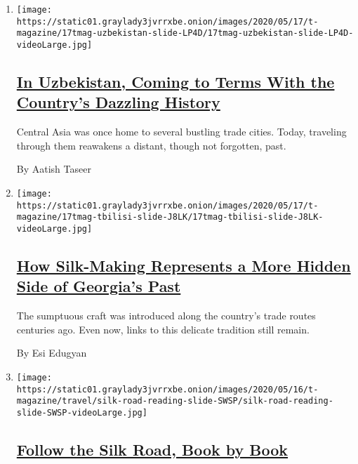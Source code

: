 \begin{enumerate}
\def\labelenumi{\arabic{enumi}.}
\item
  \texttt{[image: https://static01.graylady3jvrrxbe.onion/images/2020/05/17/t-magazine/17tmag-uzbekistan-slide-LP4D/17tmag-uzbekistan-slide-LP4D-videoLarge.jpg]}

  \hypertarget{in-uzbekistan-coming-to-terms-with-the-countrys-dazzling-history}{%
  \subsection{\texorpdfstring{\href{/2020/05/11/t-magazine/uzbekistan-history-silk-road.html}{In
  Uzbekistan, Coming to Terms With the Country's Dazzling
  History}}{In Uzbekistan, Coming to Terms With the Country's Dazzling History}}\label{in-uzbekistan-coming-to-terms-with-the-countrys-dazzling-history}}

  Central Asia was once home to several bustling trade cities. Today,
  traveling through them reawakens a distant, though not forgotten,
  past.

  By Aatish Taseer
\item
  \texttt{[image: https://static01.graylady3jvrrxbe.onion/images/2020/05/17/t-magazine/17tmag-tbilisi-slide-J8LK/17tmag-tbilisi-slide-J8LK-videoLarge.jpg]}

  \hypertarget{how-silk-making-represents-a-more-hidden-side-of-georgias-past}{%
  \subsection{\texorpdfstring{\href{/2020/05/11/t-magazine/silk-road-tbilisi-georgia.html}{How
  Silk-Making Represents a More Hidden Side of Georgia's
  Past}}{How Silk-Making Represents a More Hidden Side of Georgia's Past}}\label{how-silk-making-represents-a-more-hidden-side-of-georgias-past}}

  The sumptuous craft was introduced along the country's trade routes
  centuries ago. Even now, links to this delicate tradition still
  remain.

  By Esi Edugyan
\item
  \texttt{[image: https://static01.graylady3jvrrxbe.onion/images/2020/05/16/t-magazine/travel/silk-road-reading-slide-SWSP/silk-road-reading-slide-SWSP-videoLarge.jpg]}

  \hypertarget{follow-the-silk-road-book-by-book}{%
  \subsection{\texorpdfstring{\href{/2020/05/11/t-magazine/silk-road-reading-list-books-movies.html}{Follow
  the Silk Road, Book by
  Book}}{Follow the Silk Road, Book by Book}}\label{follow-the-silk-road-book-by-book}}


\end{enumerate}
